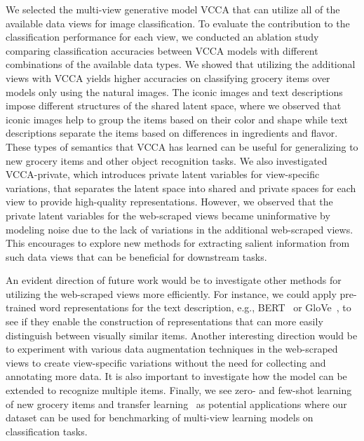 We selected the multi-view generative model VCCA that can utilize all of the available data views for image classification. 
To evaluate the contribution to the classification performance for each view, we conducted an ablation study comparing classification accuracies between VCCA models with different combinations of the available data types. We showed that utilizing the additional views with VCCA yields higher accuracies on classifying grocery items over models only using the natural images.
The iconic images and text descriptions impose different structures of the shared latent space, where we observed that iconic images help to group the items based on their color and shape while text descriptions separate the items based on differences in ingredients and flavor.
These types of semantics that VCCA has learned can be useful for generalizing to new grocery items and other object recognition tasks. We also investigated VCCA-private, which introduces private latent variables for view-specific variations, that separates the latent space into shared and private spaces for each view to provide high-quality representations. However, we observed that the private latent variables for the web-scraped views became uninformative by modeling noise due to the lack of variations in the additional web-scraped views. This encourages to explore new methods for extracting salient information from such data views that can be beneficial for downstream tasks. 

An evident direction of future work would be to investigate other methods for utilizing the web-scraped views more efficiently. For instance, we could apply pre-trained word representations for the text description, e.g., BERT~ or GloVe~, to see if they enable the construction of representations that can more easily distinguish between visually similar items. 
Another interesting direction would be to experiment with various data augmentation techniques in the web-scraped views to create view-specific variations without the need for collecting and annotating more data. It is also important to investigate how the model can be extended to recognize multiple items. Finally, we see zero- and few-shot learning~ of new grocery items and transfer learning~ as potential applications where our dataset can be used for benchmarking of multi-view learning models on classification tasks. 